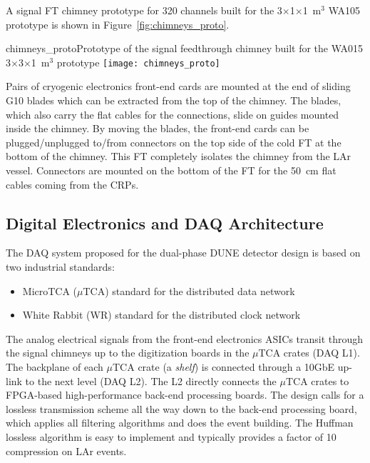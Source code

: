 A signal FT chimney prototype for 320 channels built for the
3$\times$1$\times$1~m$^3$ WA105 prototype is shown in
Figure~\ref{fig:chimneys_proto}.
\begin{cdrfigure}
{chimneys_proto}{Prototype of the signal feedthrough chimney built 
for the WA015 3$\times$3$\times$1~m$^3$ prototype}
\texttt{[image: chimneys\_proto]}
\end{cdrfigure}

Pairs of cryogenic electronics front-end cards are mounted at the end of
sliding G10 blades which can be extracted from the top of the
chimney. The blades, which also carry the flat cables for the
connections, slide on guides mounted inside the chimney. By
moving the blades, the front-end cards can be plugged/unplugged to/from 
connectors on the top side of the cold FT at
the bottom of the chimney. This FT completely isolates the
chimney from the LAr vessel. Connectors are mounted on the bottom of the FT 
for the 50~cm flat cables coming from the CRPs.

\subsection{Digital Electronics and DAQ Architecture}
\label{sec:fd-alt-elec-daq}


The DAQ system  proposed for the dual-phase DUNE
detector design is based on two industrial standards:
\begin{itemize}
\item MicroTCA ($\mu$TCA) standard for the distributed data network\cite{mTCA-standard}
\item White Rabbit (WR) standard for the distributed clock network\cite{WR-standard}
\end{itemize}

The analog electrical signals from the front-end electronics ASICs transit through the signal chimneys up to the
digitization boards in the $\mu$TCA crates (DAQ L1).
The backplane of each $\mu$TCA crate (a \textit{shelf}) is connected through a 10GbE up-link
to the next level (DAQ L2). The L2 directly connects the $\mu$TCA crates
to FPGA-based high-performance back-end processing boards. 
The design calls for a lossless transmission scheme all the way down to the
back-end processing board, which applies all filtering algorithms and
does the event building. The Huffman lossless algorithm is easy to
implement and typically provides a factor  of 10 compression on LAr events.

